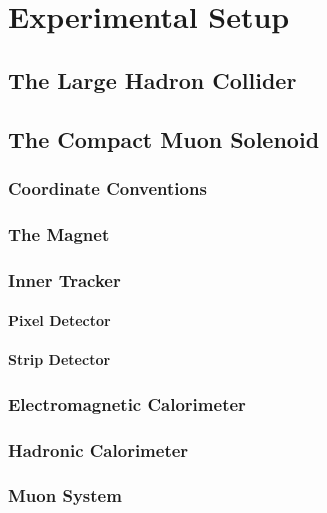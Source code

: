 \chapter{Experimental Setup}
\label{sec:setup}

\section{The Large Hadron Collider}
\label{sec:LHC}

\section{The Compact Muon Solenoid}
\label{sec:CMS}

\subsection{Coordinate Conventions}
\label{sec:coordinate}

\subsection{The Magnet}
\label{sec:magnet}

\subsection{Inner Tracker}
\label{sec:tracker}

\subsubsection{Pixel Detector}
\label{sec:tracker_pixel}

\subsubsection{Strip Detector}
\label{sec:tracker_strip}

\subsection{Electromagnetic Calorimeter}
\label{sec:ECal}

\subsection{Hadronic Calorimeter}
\label{sec:HCal}

\subsection{Muon System}
\label{sec:MuonSystem}

